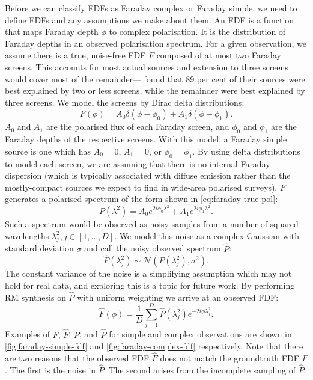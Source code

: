     Before we can classify FDFs as Faraday complex or Faraday simple, we need to define FDFs and any assumptions we make about them. An FDF is a function that maps Faraday depth $\phi$ to complex polarisation. It is the distribution of Faraday depths in an observed polarisation spectrum. For a given observation, we assume there is a true, noise-free FDF $F$ composed of at most two Faraday screens. This accounts for most actual sources \citep{anderson_broadband_2015} and extension to three screens would cover most of the remainder---\citet{osullivan_broad-band_2017} found that 89 per cent of their sources were best explained by two or less screens, while the remainder were best explained by three screens. We model the screens by Dirac delta distributions:
    \begin{equation}
        \label{eq:faraday-true-fdf}
        F(\phi) = A_0 \delta(\phi - \phi_0) + A_1 \delta(\phi - \phi_1).
    \end{equation}
    $A_0$ and $A_1$ are the polarised flux of each Faraday screen, and $\phi_0$ and $\phi_1$ are the Faraday depths of the respective screens. With this model, a Faraday simple source is one which has $A_0 = 0$, $A_1 = 0$, or $\phi_0 = \phi_1$. By using delta distributions to model each screen, we are assuming that there is no internal Faraday dispersion (which is typically associated with diffuse emission rather than the mostly-compact sources we expect to find in wide-area polarised surveys). $F$ generates a polarised spectrum of the form shown in \autoref{eq:faraday-true-pol}:
    \begin{equation}
        \label{eq:faraday-true-pol}
        P(\lambda^2) = A_0 e^{2i\phi_0\lambda^2} + A_1 e^{2i\phi_1\lambda^2}.
    \end{equation}
    Such a spectrum would be observed as noisy samples from a number of squared wavelengths $\lambda^2_j, j \in [1, \dots, D]$. We model this noise as a complex Gaussian with standard deviation $\sigma$ and call the noisy observed spectrum $\hat P$:
    \begin{equation}
      \label{eq:faraday-noisy-pol}
      \hat P(\lambda_j^2) \sim \mathcal N(P(\lambda^2_j), \sigma^2).
    \end{equation}
    The constant variance of the noise is a simplifying assumption which may not hold for real data, and exploring this is a topic for future work. By performing RM synthesis \citep{brentjens_faraday_2005} on $\hat P$ with uniform weighting we arrive at an observed FDF:
    \begin{equation}
      \label{eq:faraday-rm-synthesis}
      \hat F(\phi) = \frac{1}{D} \sum_{j = 1}^D \hat P(\lambda^2_j) e^{-2i\phi\lambda^2_j}.
    \end{equation}
    Examples of $F$, $\hat F$, $P$, and $\hat P$ for simple and complex observations are shown in \autoref{fig:faraday-simple-fdf} and \autoref{fig:faraday-complex-fdf} respectively. Note that there are two reasons that the observed FDF $\hat F$ does not match the groundtruth FDF $F$. The first is the noise in $\hat P$. The second arises from the incomplete sampling of $\hat P$.

